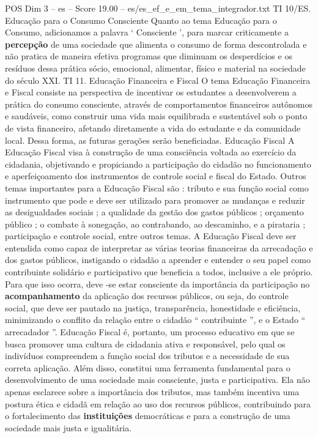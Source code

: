 \begin{textsample}{POS Dim 3 – es – Score 19.00 – es/es\_ef\_e\_em\_tema\_integrador.txt}
TI 10/ES.
Educação para o Consumo Consciente Quanto ao tema Educação para o Consumo, adicionamos a palavra ‘ Consciente ’, para marcar criticamente a \textbf{percepção} de uma sociedade que alimenta o consumo de forma descontrolada e não pratica de maneira efetiva programas que diminuam os desperdícios e os resíduos dessa prática sócio, emocional, alimentar, físico e material na sociedade do século XXI.
TI 11.
Educação Financeira e Fiscal O tema Educação Financeira e Fiscal consiste na perspectiva de incentivar os estudantes a desenvolverem a prática do consumo consciente, através de comportamentos financeiros autônomos e saudáveis, como construir uma vida mais equilibrada e sustentável sob o ponto de vista financeiro, afetando diretamente a vida do estudante e da comunidade local.
Dessa forma, as futuras gerações serão beneficiadas.
Educação Fiscal A Educação Fiscal visa à construção de uma consciência voltada ao exercício da cidadania, objetivando e propiciando a participação do cidadão no funcionamento e aperfeiçoamento dos instrumentos de controle social e fiscal do Estado.
Outros temas importantes para a Educação Fiscal são : tributo e sua função social como instrumento que pode e deve ser utilizado para promover as mudanças e reduzir as desigualdades sociais ; a qualidade da gestão dos gastos públicos ; orçamento público ; o combate à sonegação, ao contrabando, ao descaminho, e a pirataria ; participação e controle social, entre outros temas.
A Educação Fiscal deve ser entendida como capaz de interpretar as várias teorias financeiras da arrecadação e dos gastos públicos, instigando o cidadão a aprender e entender o seu papel como contribuinte solidário e participativo que beneficia a todos, inclusive a ele próprio.
Para que isso ocorra, deve -se estar consciente da importância da participação no \textbf{acompanhamento} da aplicação dos recursos públicos, ou seja, do controle social, que deve ser pautado na justiça, transparência, honestidade e eficiência, minimizando o conflito da relação entre o cidadão “ contribuinte ”, e o Estado “ arrecadador ”.
Educação Fiscal é, portanto, um processo educativo em que se busca promover uma cultura de cidadania ativa e responsável, pelo qual os indivíduos compreendem a função social dos tributos e a necessidade de sua correta aplicação.
Além disso, constitui uma ferramenta fundamental para o desenvolvimento de uma sociedade mais consciente, justa e participativa.
Ela não apenas esclarece sobre a importância dos tributos, mas também incentiva uma postura ética e cidadã em relação ao uso dos recursos públicos, contribuindo para o fortalecimento das \textbf{instituições} democráticas e para a construção de uma sociedade mais justa e igualitária.

\end{textsample}

